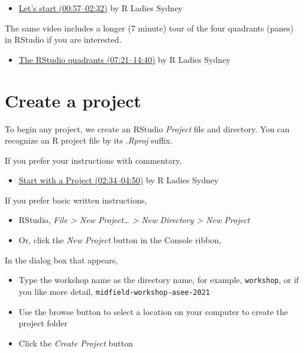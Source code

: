 \documentclass[
]{book}
\providecommand{\tightlist}{%
  \setlength{\itemsep}{0pt}\setlength{\parskip}{0pt}}
\begin{document}
\begin{itemize}
\tightlist
\item
  \href{https://www.youtube.com/embed/kfcX5DEMAp4?start=57\&end=152}{Let's start (00:57--02:32)} by R Ladies Sydney \citep{RLadiesSydney:2018:Lesson1}
\end{itemize}

The same video includes a longer (7 minute) tour of the four quadrants (panes) in RStudio if you are interested.

\begin{itemize}
\tightlist
\item
  \href{https://www.youtube.com/embed/kfcX5DEMAp4?start=441\&end=880}{The RStudio quadrants (07:21--14:40)} by R Ladies Sydney \citep{RLadiesSydney:2018:Lesson1}
\end{itemize}

\hypertarget{create-a-project}{%
\section{Create a project}\label{create-a-project}}

To begin any project, we create an RStudio \emph{Project} file and directory. You can recognize an R project file by its \emph{.Rproj} suffix.

If you prefer your instructions with commentary,

\begin{itemize}
\tightlist
\item
  \href{https://www.youtube.com/embed/kfcX5DEMAp4?start=154\&end=290}{Start with a Project (02:34--04:50)} by R Ladies Sydney \citep{RLadiesSydney:2018:Lesson1}
\end{itemize}

If you prefer basic written instructions,

\begin{itemize}
\tightlist
\item
  RStudio, \emph{File \textgreater{} New Project\ldots{} \textgreater{} New Directory \textgreater{} New Project}
\item
  Or, click the \emph{New Project} button in the Console ribbon,
\end{itemize}

In the dialog box that appears,

\begin{itemize}
\tightlist
\item
  Type the workshop name as the directory name, for example, \texttt{workshop}, or if you like more detail, \texttt{midfield-workshop-asee-2021}\\
\item
  Use the browse button to select a location on your computer to create the project folder\\
\item
  Click the \emph{Create Project} button
\end{itemize}
\end{document}
